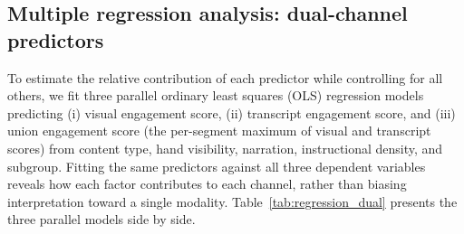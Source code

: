 \documentclass[fleqn,10pt]{wlscirep}
\begin{document}
\subsection*{Multiple regression analysis: dual-channel predictors}

To estimate the relative contribution of each predictor while controlling for all others, we fit three parallel ordinary least squares (OLS) regression models predicting (i) visual engagement score, (ii) transcript engagement score, and (iii) union engagement score (the per-segment maximum of visual and transcript scores) from content type, hand visibility, narration, instructional density, and subgroup. Fitting the same predictors against all three dependent variables reveals how each factor contributes to each channel, rather than biasing interpretation toward a single modality. Table~\ref{tab:regression_dual} presents the three parallel models side by side.
\end{document}
